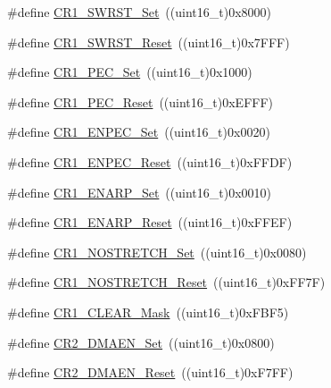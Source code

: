 \begin{DoxyCompactItemize}
\item 
\#define \mbox{\hyperlink{group___i2_c___private___defines_ga0e067bb108052ea0e8e49feb194c2ca0}{C\+R1\+\_\+\+S\+W\+R\+S\+T\+\_\+\+Set}}~((uint16\+\_\+t)0x8000)
\item 
\#define \mbox{\hyperlink{group___i2_c___private___defines_gab41b615034ed8f830ef4900a0fcefc39}{C\+R1\+\_\+\+S\+W\+R\+S\+T\+\_\+\+Reset}}~((uint16\+\_\+t)0x7\+F\+F\+F)
\item 
\#define \mbox{\hyperlink{group___i2_c___private___defines_gad0ab853d291338d4cf3aee736353f0b8}{C\+R1\+\_\+\+P\+E\+C\+\_\+\+Set}}~((uint16\+\_\+t)0x1000)
\item 
\#define \mbox{\hyperlink{group___i2_c___private___defines_gabb6969dfa44c3539ef93f04f8136c3c7}{C\+R1\+\_\+\+P\+E\+C\+\_\+\+Reset}}~((uint16\+\_\+t)0x\+E\+F\+F\+F)
\item 
\#define \mbox{\hyperlink{group___i2_c___private___defines_ga7fdf69341e5debc3244812012ae332e6}{C\+R1\+\_\+\+E\+N\+P\+E\+C\+\_\+\+Set}}~((uint16\+\_\+t)0x0020)
\item 
\#define \mbox{\hyperlink{group___i2_c___private___defines_gabd33104d7b8e4673fa330f4ca3a97e44}{C\+R1\+\_\+\+E\+N\+P\+E\+C\+\_\+\+Reset}}~((uint16\+\_\+t)0x\+F\+F\+D\+F)
\item 
\#define \mbox{\hyperlink{group___i2_c___private___defines_ga73cfd7b486b4279fc6a83de64ab23985}{C\+R1\+\_\+\+E\+N\+A\+R\+P\+\_\+\+Set}}~((uint16\+\_\+t)0x0010)
\item 
\#define \mbox{\hyperlink{group___i2_c___private___defines_ga173b065ec9b7b33c0fa0bf71c0fa2207}{C\+R1\+\_\+\+E\+N\+A\+R\+P\+\_\+\+Reset}}~((uint16\+\_\+t)0x\+F\+F\+E\+F)
\item 
\#define \mbox{\hyperlink{group___i2_c___private___defines_gac4abee43c3523527780f200adf465bc0}{C\+R1\+\_\+\+N\+O\+S\+T\+R\+E\+T\+C\+H\+\_\+\+Set}}~((uint16\+\_\+t)0x0080)
\item 
\#define \mbox{\hyperlink{group___i2_c___private___defines_ga9a1609fd4bbcc38fc6423836730c8fa0}{C\+R1\+\_\+\+N\+O\+S\+T\+R\+E\+T\+C\+H\+\_\+\+Reset}}~((uint16\+\_\+t)0x\+F\+F7\+F)
\item 
\#define \mbox{\hyperlink{group___i2_c___private___defines_ga67f7dd35ea3d1296677e5fc50b88fa90}{C\+R1\+\_\+\+C\+L\+E\+A\+R\+\_\+\+Mask}}~((uint16\+\_\+t)0x\+F\+B\+F5)
\item 
\#define \mbox{\hyperlink{group___i2_c___private___defines_gafe82da50fa03bd5ecb36340da64c87ca}{C\+R2\+\_\+\+D\+M\+A\+E\+N\+\_\+\+Set}}~((uint16\+\_\+t)0x0800)
\item 
\#define \mbox{\hyperlink{group___i2_c___private___defines_gabe742f89a768e29b9a2d86f7782991a6}{C\+R2\+\_\+\+D\+M\+A\+E\+N\+\_\+\+Reset}}~((uint16\+\_\+t)0x\+F7\+F\+F)

\end{DoxyCompactItemize}
